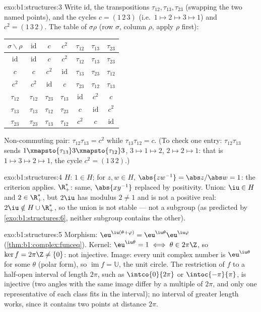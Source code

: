 \begin{solution}{exo:b1:structures:3}
Write $\mathrm{id}$, the transpositions $\tau_{12}, \tau_{13},
\tau_{23}$ (swapping the two named points), and the cycles $c =
(1\,2\,3)$ (i.e.\ $1 \mapsto 2 \mapsto 3 \mapsto 1$) and $c^2 =
(1\,3\,2)$. The table of $\sigma\rho$ (row $\sigma$, column $\rho$,
apply $\rho$ first):
\begin{center}
\renewcommand{\arraystretch}{1.2}
\begin{tabular}{c|cccccc}
$\sigma\backslash\rho$ & $\mathrm{id}$ & $c$ & $c^2$ & $\tau_{12}$ &
$\tau_{13}$ & $\tau_{23}$ \\
\hline
$\mathrm{id}$ & $\mathrm{id}$ & $c$ & $c^2$ & $\tau_{12}$ &
$\tau_{13}$ & $\tau_{23}$ \\
$c$ & $c$ & $c^2$ & $\mathrm{id}$ & $\tau_{13}$ & $\tau_{23}$ &
$\tau_{12}$ \\
$c^2$ & $c^2$ & $\mathrm{id}$ & $c$ & $\tau_{23}$ & $\tau_{12}$ &
$\tau_{13}$ \\
$\tau_{12}$ & $\tau_{12}$ & $\tau_{23}$ & $\tau_{13}$ & $\mathrm{id}$
& $c^2$ & $c$ \\
$\tau_{13}$ & $\tau_{13}$ & $\tau_{12}$ & $\tau_{23}$ & $c$ &
$\mathrm{id}$ & $c^2$ \\
$\tau_{23}$ & $\tau_{23}$ & $\tau_{13}$ & $\tau_{12}$ & $c^2$ & $c$ &
$\mathrm{id}$ \\
\end{tabular}
\end{center}
Non-commuting pair: $\tau_{12}\tau_{13} = c^2$ while
$\tau_{13}\tau_{12} = c$. (To check one entry:
$\tau_{12}\tau_{13}$ sends $1 \xmapsto{\tau_{13}} 3
\xmapsto{\tau_{12}} 3$, $3 \mapsto 1 \mapsto 2$, $2 \mapsto 2 \mapsto
1$: that is $1 \mapsto 3 \mapsto 2 \mapsto 1$, the cycle $c^2 =
(1\,3\,2)$.)
\end{solution}

\begin{solution}{exo:b1:structures:4}
$H$: $1 \in H$; for $z, w \in H$, $\abs{zw^{-1}} = \abs z / \abs w =
1$: the criterion applies. $\R_+^*$: same, $\abs{xy^{-1}}$ replaced by
positivity. Union: $\iu \in H$ and $2 \in \R_+^*$, but $2\iu$ has
modulus $2 \neq 1$ and is not a positive real: $2\iu \notin H \cup
\R_+^*$, so the union is not stable --- not a subgroup (as predicted
by \cref{exo:b1:structures:6}, neither subgroup contains the other).
\end{solution}

\begin{solution}{exo:b1:structures:5}
Morphism: $\eu^{\iu(\theta + \varphi)} =
\eu^{\iu\theta}\eu^{\iu\varphi}$ (\cref{thm:b1:complex:funceq}).
Kernel: $\eu^{\iu\theta} = 1 \iff \theta \in 2\pi\Z$, so $\ker f =
2\pi\Z \neq \{0\}$: not injective. Image: every unit complex number is
$\eu^{\iu\theta}$ for some $\theta$ (polar form), so
$\operatorname{im} f = \mathbb{U}$, the unit circle. The restriction
of $f$ to a half-open interval of length $2\pi$, such as
$\intco{0}{2\pi}$ or $\intoc{-\pi}{\pi}$, is injective (two angles
with the same image differ by a multiple of $2\pi$, and only one
representative of each class fits in the interval); no interval of
greater length works, since it contains two points at distance
$2\pi$.
\end{solution}

